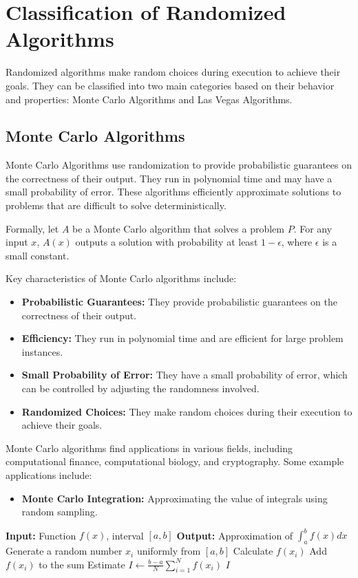 \documentclass[12pt]{book} %
\begin{document}
\section{Classification of Randomized Algorithms}

Randomized algorithms make random choices during execution to achieve their goals. They can be classified into two main categories based on their behavior and properties: Monte Carlo Algorithms and Las Vegas Algorithms.

\subsection{Monte Carlo Algorithms}

Monte Carlo Algorithms use randomization to provide probabilistic guarantees on the correctness of their output. They run in polynomial time and may have a small probability of error. These algorithms efficiently approximate solutions to problems that are difficult to solve deterministically.

Formally, let $A$ be a Monte Carlo algorithm that solves a problem $P$. For any input $x$, $A(x)$ outputs a solution with probability at least $1 - \epsilon$, where $\epsilon$ is a small constant. 

Key characteristics of Monte Carlo algorithms include:

\begin{itemize}
    \item \textbf{Probabilistic Guarantees:} They provide probabilistic guarantees on the correctness of their output.
    \item \textbf{Efficiency:} They run in polynomial time and are efficient for large problem instances.
    \item \textbf{Small Probability of Error:} They have a small probability of error, which can be controlled by adjusting the randomness involved.
    \item \textbf{Randomized Choices:} They make random choices during their execution to achieve their goals.
\end{itemize}

Monte Carlo algorithms find applications in various fields, including computational finance, computational biology, and cryptography. Some example applications include:
\begin{itemize}
    \item \textbf{Monte Carlo Integration:} Approximating the value of integrals using random sampling.
\end{itemize}
\FloatBarrier
\begin{algorithm}
\caption{Monte Carlo Integration}
\begin{algorithmic}[1]
\State \textbf{Input:} Function $f(x)$, interval $[a, b]$
\State \textbf{Output:} Approximation of $\int_a^b f(x) dx$
    \State Generate a random number $x_i$ uniformly from $[a, b]$
    \State Calculate $f(x_i)$
    \State Add $f(x_i)$ to the sum
\EndFor
\State Estimate $I \leftarrow \frac{b - a}{N} \sum_{i=1}^{N} f(x_i)$
\Return $I$
\end{algorithmic}
\end{algorithm}
\FloatBarrier
\end{document}
